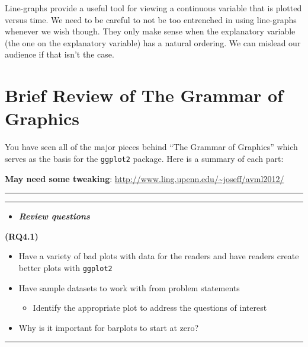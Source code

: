 \documentclass[]{tufte-book}
\providecommand{\tightlist}{%
  \setlength{\itemsep}{0pt}\setlength{\parskip}{0pt}}
\newenvironment{rmdblock}[1]
  {\begin{shaded*}
  \begin{itemize}
  \renewcommand{\labelitemi}{
    \raisebox{-.7\height}[0pt][0pt]{
    }
  }
  \item
  }
  {
  \end{itemize}
  \end{shaded*}
  }
\newenvironment{review}
  {\begin{rmdblock}{warning}}
  {\end{rmdblock}}
\begin{document}
Line-graphs provide a useful tool for viewing a continuous variable that
is plotted versus time. We need to be careful to not be too entrenched
in using line-graphs whenever we wish though. They only make sense when
the explanatory variable (the one on the explanatory variable) has a
natural ordering. We can mislead our audience if that isn't the case.

\section{Brief Review of The Grammar of
Graphics}\label{brief-review-of-the-grammar-of-graphics}

You have seen all of the major pieces behind ``The Grammar of Graphics''
which serves as the basis for the \texttt{ggplot2} package. Here is a
summary of each part:

\textbf{May need some tweaking}:
\url{http://www.ling.upenn.edu/~joseff/avml2012/}

\begin{center}\rule{0.5\linewidth}{\linethickness}\end{center}

\begin{center}\rule{0.5\linewidth}{\linethickness}\end{center}

\begin{review}
\textbf{\emph{Review questions}}
\end{review}

\textbf{(RQ4.1)}

\begin{itemize}
\item
  Have a variety of bad plots with data for the readers and have readers
  create better plots with \texttt{ggplot2}
\item
  Have sample datasets to work with from problem statements

  \begin{itemize}
  \tightlist
  \item
    Identify the appropriate plot to address the questions of interest
  \end{itemize}
\item
  Why is it important for barplots to start at zero?
\end{itemize}

\begin{center}\rule{0.5\linewidth}{\linethickness}\end{center}
\end{document}
